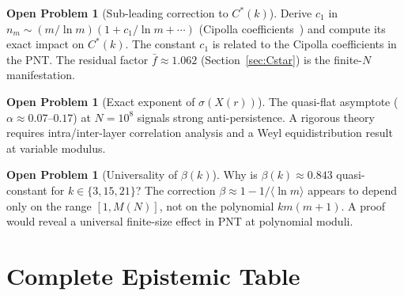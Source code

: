 \documentclass[11pt,a4paper]{article}
\theoremstyle{definition}
\newtheorem{problem}[theorem]{Open Problem}
\theoremstyle{remark}
\begin{document}
\begin{openprobbox}
\begin{problem}[Sub-leading correction to $C^{*}(k)$]\label{op:O5}
Derive $c_{1}$ in $n_{m}\sim(m/\ln m)(1+c_{1}/\ln m+\cdots)$
(Cipolla coefficients~\cite{Cipolla1902}) and compute its exact
impact on $C^{*}(k)$. The constant $c_{1}$ is related to the Cipolla
coefficients in the PNT. The residual factor $\bar{f}\approx 1.062$
(Section~\ref{sec:Cstar}) is the finite-$N$ manifestation.
\end{problem}
\end{openprobbox}

\begin{openprobbox}
\begin{problem}[Exact exponent of $\sigma(X(r))$]\label{op:O6}
The quasi-flat asymptote ($\alpha\approx 0.07$--$0.17$) at $N=10^{8}$
signals strong anti-persistence. A rigorous theory requires
intra/inter-layer correlation analysis and a Weyl equidistribution
result at variable modulus.
\end{problem}
\end{openprobbox}

\begin{openprobbox}
\begin{problem}[Universality of $\beta(k)$]\label{op:O7}
Why is $\beta(k)\approx 0.843$ quasi-constant for $k\in\{3,15,21\}$?
The correction $\beta\approx 1-1/\langle\ln m\rangle$ appears to
depend only on the range $[1,M(N)]$, not on the polynomial
$km(m+1)$. A proof would reveal a universal finite-size effect in
PNT at polynomial moduli.
\end{problem}
\end{openprobbox}

\section{Complete Epistemic Table}\label{sec:epistemic-table}
\end{document}
